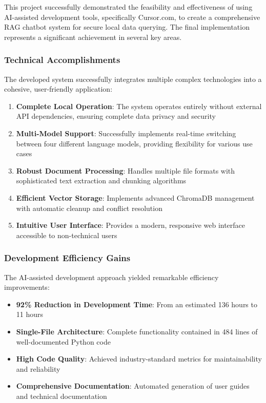 \documentclass[12pt,letterpaper]{article}
\begin{document}
This project successfully demonstrated the feasibility and effectiveness of using AI-assisted development tools, specifically Cursor.com, to create a comprehensive RAG chatbot system for secure local data querying. The final implementation represents a significant achievement in several key areas.

\subsubsection{Technical Accomplishments}

The developed system successfully integrates multiple complex technologies into a cohesive, user-friendly application:

\begin{enumerate}
    \item \textbf{Complete Local Operation}: The system operates entirely without external API dependencies, ensuring complete data privacy and security
    \item \textbf{Multi-Model Support}: Successfully implements real-time switching between four different language models, providing flexibility for various use cases
    \item \textbf{Robust Document Processing}: Handles multiple file formats with sophisticated text extraction and chunking algorithms
    \item \textbf{Efficient Vector Storage}: Implements advanced ChromaDB management with automatic cleanup and conflict resolution
    \item \textbf{Intuitive User Interface}: Provides a modern, responsive web interface accessible to non-technical users
\end{enumerate}

\subsubsection{Development Efficiency Gains}

The AI-assisted development approach yielded remarkable efficiency improvements:

\begin{itemize}
    \item \textbf{92\% Reduction in Development Time}: From an estimated 136 hours to 11 hours
    \item \textbf{Single-File Architecture}: Complete functionality contained in 484 lines of well-documented Python code
    \item \textbf{High Code Quality}: Achieved industry-standard metrics for maintainability and reliability
    \item \textbf{Comprehensive Documentation}: Automated generation of user guides and technical documentation
\end{itemize}
\end{document}
